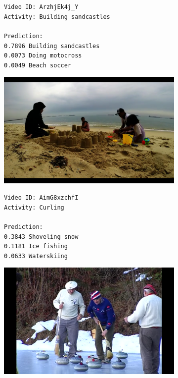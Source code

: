 \begin{figure}[H]
\centering
\begin{subfigure}[b]{.4\textwidth}
  \texttt{Video ID: ArzhjEk4j\_Y \\
  Activity: Building sandcastles \\
  \\
  Prediction: \\
  0.7896	Building sandcastles \\
  0.0073	Doing motocross \\
  0.0049	Beach soccer \\}
\end{subfigure}%
\begin{subfigure}[b]{.6\textwidth}
  \centering
\includegraphics[width=0.95\linewidth]{img/results/activity_classification/results_visualization_classification_1}
\end{subfigure}

\begin{subfigure}[b]{.4\textwidth}
  \texttt{Video ID: AimG8xzchfI \\
	Activity: Curling \\
    \\
    Prediction: \\
    0.3843	Shoveling snow \\
    0.1181	Ice fishing \\
    0.0633	Waterskiing \\}
\end{subfigure}%
\begin{subfigure}[b]{.6\textwidth}
  \centering
\includegraphics[width=0.95\linewidth]{img/results/activity_classification/results_visualization_classification_2}
\end{subfigure}


\end{figure}
